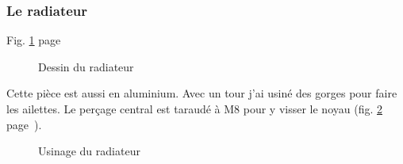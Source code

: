 \subsubsection{Le radiateur}%
Fig. \ref{sch_radiateur} page~\pageref{sch_radiateur} \par %
\begin{figure}%
   \caption{\label{sch_radiateur} Dessin du radiateur}%
\end{figure}%
Cette pièce est aussi en aluminium. Avec un tour j'ai usiné des gorges pour faire les ailettes.%
Le perçage central est taraudé à M8 pour y visser le noyau (fig. \ref{usinage_radiateur} %
page~\pageref{usinage_radiateur}).%
\begin{figure}%
   \caption{\label{usinage_radiateur} Usinage du radiateur}%
\end{figure}%
